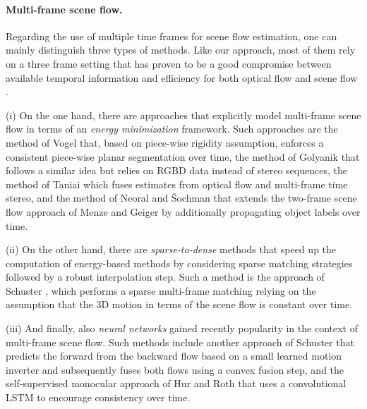\documentclass[10pt,twocolumn,letterpaper]{article}
\begin{document}
\paragraph{Multi-frame scene flow.}
Regarding the use of multiple time frames for scene flow estimation,
one can mainly distinguish three types of methods.
Like our approach, most of them rely on a three frame setting that has proven to be a good compromise between available temporal information and efficiency for both optical flow \cite{Maurer2018_ProFlow,Maurer2018,Ren2019_FlowTemporalFusion,Wulff2017_MRFlow} and scene flow \cite{Hur2021_MonoSceneFlow,Neoral2017_SceneFlowTemporal,Schuster2021_DTF,Schuster2020_SceneFlowFields,Taniai2017_MultiFrameSceneFlow}. 

(i) On the one hand, there are approaches that explicitly model multi-frame scene flow in terms of an {\em energy minimization} framework. Such approaches are the method of Vogel \etal \cite{Vogel2015_PRSM} that, based on piece-wise rigidity assumption, enforces a consistent piece-wise planar segmentation over time, the method of Golyanik \etal \cite{Golyanik2017_3DV} that follows a similar idea but relies on RGBD data instead of stereo sequences, the method of Taniai \etal \cite{Taniai2017_MultiFrameSceneFlow} which fuses estimates from optical flow and multi-frame time stereo, and the method of Neoral and \v{S}ochman \cite{Neoral2017_SceneFlowTemporal} that extends the two-frame scene flow approach of Menze and Geiger \cite{Menze2015_KITTI} by additionally propagating object labels over time.

(ii) On the other hand, there are {\em sparse-to-dense} methods that speed up the computation of energy-based methods by considering sparse matching strategies followed by a robust interpolation step. Such a method is the approach of Schuster \etal \cite{Schuster2020_SceneFlowFields}, which performs a sparse multi-frame matching relying on the assumption that the 3D motion in terms of the scene flow is constant over time. 

(iii) And finally, also {\em neural networks}
gained recently popularity in the context of multi-frame scene flow. 
Such methods include another approach of Schuster \etal \cite{Schuster2021_DTF} that predicts the forward from the backward flow based on a small learned motion inverter and subsequently fuses both flows using a convex fusion step, and the self-supervised monocular approach of Hur and Roth \cite{Hur2021_MonoSceneFlow} that uses a convolutional LSTM to encourage consistency over time.
\end{document}
